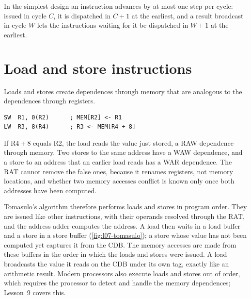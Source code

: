 \documentclass[../main.tex]{subfiles}
\begin{document}
\begin{keypoint}
  In the simplest design an instruction advances by at most one step per
  cycle: issued in cycle $C$, it is dispatched in $C+1$ at the earliest, and a
  result broadcast in cycle $W$ lets the instructions waiting for it be
  dispatched in $W+1$ at the earliest.
\end{keypoint}

\section{Load and store instructions}
\label{sec:l07-load-store}

Loads and stores create dependences through memory that are analogous to the
dependences through registers.
\begin{lstlisting}[language={[x86masm]Assembler}, numbers=none]
SW  R1, 0(R2)      ; MEM[R2] <- R1
LW  R3, 8(R4)      ; R3 <- MEM[R4 + 8]
\end{lstlisting}
If R4${}+8$ equals R2, the load reads the value just stored, a RAW
dependence through memory.  Two stores to the same address have a WAW
dependence, and a store to an address that an earlier load reads has a WAR
dependence.  The RAT cannot remove the false ones, because it renames
registers, not memory locations, and whether two memory accesses conflict is
known only once both addresses have been computed.

Tomasulo's algorithm therefore performs loads and stores in program
order.  They are issued like other instructions, with their operands resolved through
the RAT, and the address adder computes the address.  A load then waits in a
load buffer and a store in a store buffer (\cref{fig:l07-tomasulo}); a store
whose value has not been computed yet captures it from the CDB.  The
memory accesses are made from these buffers in the order in which the loads
and stores were issued.  A load broadcasts the value it reads on
the CDB under its own tag, exactly like an arithmetic result.  Modern
processors also execute loads and stores out of order, which requires the
processor to detect and handle the memory dependences; Lesson~9 covers this.
\end{document}
